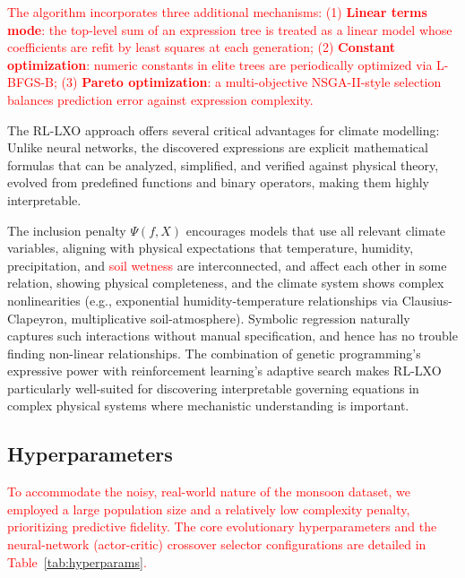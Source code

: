 \documentclass{article}
\begin{document}
\textcolor{red}{
The algorithm incorporates three additional mechanisms: (1) \textbf{Linear terms mode}: the top-level sum of an expression tree is treated as a linear model whose coefficients are refit by least squares at each generation; (2) \textbf{Constant optimization}: numeric constants in elite trees are periodically optimized via L-BFGS-B; (3) \textbf{Pareto optimization}: a multi-objective NSGA-II-style selection balances prediction error against expression complexity.}

The RL-LXO approach offers several critical advantages for climate modelling: Unlike neural networks, the discovered expressions are explicit mathematical formulas that can be analyzed, simplified, and verified against physical theory, evolved from predefined functions and binary operators, making them highly interpretable.\
    
The inclusion penalty $\Psi(f, X)$ encourages models that use all relevant climate variables, aligning with physical expectations that temperature, humidity, precipitation, and \textcolor{red}{soil wetness} are interconnected, and affect each other in some relation, showing physical completeness, and the climate system shows complex nonlinearities (e.g., exponential humidity-temperature relationships via Clausius-Clapeyron, multiplicative soil-atmosphere). Symbolic regression naturally captures such interactions without manual specification, and hence has no trouble finding non-linear relationships. The combination of genetic programming's expressive power with reinforcement learning's adaptive search makes RL-LXO particularly well-suited for discovering interpretable governing equations in complex physical systems where mechanistic understanding is important. 

\subsection{Hyperparameters}
\textcolor{red}{
To accommodate the noisy, real-world nature of the monsoon dataset, we employed a large population size and a relatively low complexity penalty, prioritizing predictive fidelity. The core evolutionary hyperparameters and the neural-network (actor-critic) crossover selector configurations are detailed in Table~\ref{tab:hyperparams}.}
\end{document}
